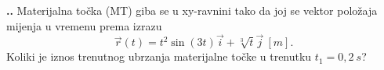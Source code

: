
\noindent 
\textbf{
\thecjelina.\thezadatak.}
Materijalna točka (MT)  giba se u xy-ravnini tako da joj se vektor položaja mijenja u vremenu prema izrazu
$$
\vec{r}(t)=t^2\sin{(3t)}\vec{i}+\sqrt[3]{t}\vec{j}\ [m]. 
$$
Koliki je iznos trenutnog ubrzanja materijalne točke u trenutku $t_1=0,2\ s$?

